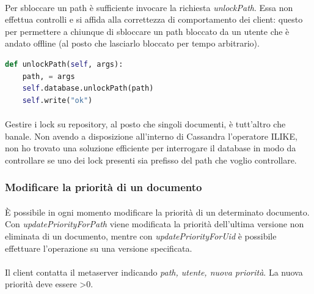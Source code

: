 \documentclass{article}
\begin{document}
\paragraph{} Per sbloccare un path è sufficiente invocare la richiesta \emph{unlockPath}. Essa non effettua controlli e si affida alla correttezza di comportamento dei client: questo per permettere a chiunque di sbloccare un path bloccato da un utente che è andato offline (al posto che lasciarlo bloccato per tempo arbitrario). 

\begin{lstlisting}[language=Python, title=Metaserver]
def unlockPath(self, args):
    path, = args
    self.database.unlockPath(path)
    self.write("ok")
\end{lstlisting}

\paragraph{} Gestire i lock su repository, al posto che singoli documenti, è tutt'altro che banale. Non avendo a disposizione all'interno di Cassandra l'operatore ILIKE, non ho trovato una soluzione efficiente per interrogare il database in modo da controllare se uno dei lock presenti sia prefisso del path che voglio controllare. 

\subsubsection{Modificare la priorità di un documento}

\paragraph{} È possibile in ogni momento modificare la priorità di un determinato documento. Con \emph{updatePriorityForPath} viene modificata la priorità dell'ultima versione non eliminata di un documento, mentre con \emph{updatePriorityForUid} è possibile effettuare l'operazione su una versione specificata. 

\paragraph{} Il client contatta il metaserver indicando \emph{path, utente, nuova priorità}. La nuova priorità deve essere >0. 
\end{document}
